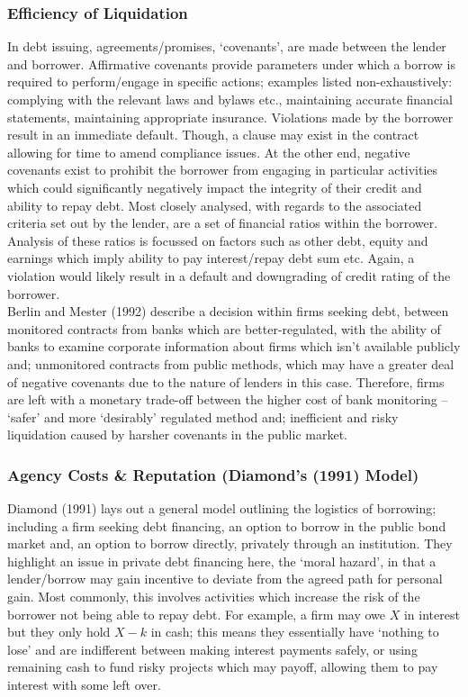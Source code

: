 \documentclass[11pt, english]{article}
\begin{document}
		\subsubsection*{Efficiency of Liquidation}

	In debt issuing, agreements/promises, ‘covenants’, are made between the lender and borrower. Affirmative covenants provide parameters under which a borrow is required to perform/engage in specific actions; examples listed non-exhaustively: complying with the relevant laws and bylaws etc., maintaining accurate financial statements, maintaining appropriate insurance. Violations made by the borrower result in an immediate default. Though, a clause may exist in the contract allowing for time to amend compliance issues. At the other end, negative covenants exist to prohibit the borrower from engaging in particular activities which could significantly negatively impact the integrity of their credit and ability to repay debt. Most closely analysed, with regards to the associated criteria set out by the lender, are a set of financial ratios within the borrower. Analysis of these ratios is focussed on factors such as other debt, equity and earnings which imply ability to pay interest/repay debt sum etc. Again, a violation would likely result in a default and downgrading of credit rating of the borrower.\\

	Berlin and Mester (1992) describe a decision within firms seeking debt, between monitored contracts from banks which are better-regulated, with the ability of banks to examine corporate information about firms which isn’t available publicly and; unmonitored contracts from public methods, which may have a greater deal of negative covenants due to the nature of lenders in this case. Therefore, firms are left with a monetary trade-off between the higher cost of bank monitoring – ‘safer’ and more ‘desirably’ regulated method and; inefficient and risky liquidation caused by harsher covenants in the public market.

		\subsubsection*{Agency Costs \& Reputation (Diamond's (1991) Model)}

	Diamond (1991) lays out a general model outlining the logistics of borrowing; including a firm seeking debt financing, an option to borrow in the public bond market and, an option to borrow directly, privately through an institution. They highlight an issue in private debt financing here, the ‘moral hazard’, in that a lender/borrow may gain incentive to deviate from the agreed path for personal gain. Most commonly, this involves activities which increase the risk of the borrower not being able to repay debt. For example, a firm may owe $X$ in interest but they only hold $X-k$ in cash; this means they essentially have ‘nothing to lose’ and are indifferent between making interest payments safely, or using remaining cash to fund risky projects which may payoff, allowing them to pay interest with some left over.\\
\end{document}
